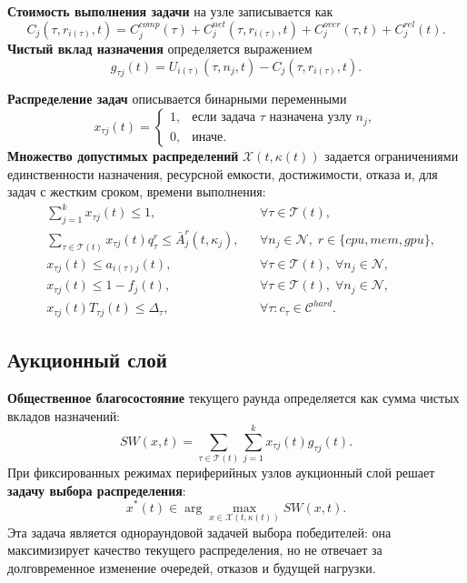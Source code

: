 \documentclass[a4paper,14pt]{extarticle}
\begin{document}
\textbf{Стоимость выполнения задачи} на узле записывается как
\begin{equation}
	C_j(\tau,r_{i(\tau)},t)=C^{comp}_j(\tau)+C^{net}_j(\tau,r_{i(\tau)},t)+C^{over}_j(\tau,t)+C^{rel}_j(t).
	\label{eq:nir_cost}
\end{equation}
\textbf{Чистый вклад назначения} определяется выражением
\begin{equation}
	g_{\tau j}(t)=U_{i(\tau)}(\tau,n_j,t)-C_j(\tau,r_{i(\tau)},t).
	\label{eq:nir_assignment_gain}
\end{equation}

\textbf{Распределение задач} описывается бинарными переменными
\begin{equation}
	x_{\tau j}(t)=
	\begin{cases}
		1, & \text{если задача } \tau \text{ назначена узлу } n_j,\\
		0, & \text{иначе.}
	\end{cases}
	\label{eq:nir_assignment_var}
\end{equation}
\textbf{Множество допустимых распределений} $\mathcal{X}(t,\kappa(t))$ задается ограничениями единственности назначения, ресурсной емкости, достижимости, отказа и, для задач с жестким сроком, времени выполнения:
\begin{align}
	&\sum_{j=1}^{k}x_{\tau j}(t)\leq 1, &&\forall \tau\in\mathcal{T}(t),
	\label{eq:nir_single_assignment}\\
	&\sum_{\tau\in\mathcal{T}(t)}x_{\tau j}(t)q^r_{\tau}\leq \bar{A}^{r}_{j}(t,\kappa_j), &&\forall n_j\in\mathcal{N},\; r\in\{cpu,mem,gpu\},
	\label{eq:nir_capacity_constraint}\\
	&x_{\tau j}(t)\leq a_{i(\tau)j}(t), &&\forall \tau\in\mathcal{T}(t),\; \forall n_j\in\mathcal{N},
	\label{eq:nir_reachability_constraint}\\
	&x_{\tau j}(t)\leq 1-f_j(t), &&\forall \tau\in\mathcal{T}(t),\; \forall n_j\in\mathcal{N},
	\label{eq:nir_failure_constraint}\\
	&x_{\tau j}(t)T_{\tau j}(t)\leq \Delta_{\tau}, &&\forall \tau: c_{\tau}\in\mathcal{C}^{hard}.
	\label{eq:nir_deadline_constraint}
\end{align}

\subsection{Аукционный слой}

\textbf{Общественное благосостояние} текущего раунда определяется как сумма чистых вкладов назначений:
\begin{equation}
	SW(x,t)=\sum_{\tau\in\mathcal{T}(t)}\sum_{j=1}^{k}x_{\tau j}(t)g_{\tau j}(t).
	\label{eq:nir_social_welfare}
\end{equation}
При фиксированных режимах периферийных узлов аукционный слой решает \textbf{задачу выбора распределения}:
\begin{equation}
	x^*(t)\in\arg\max_{x\in\mathcal{X}(t,\kappa(t))}SW(x,t).
	\label{eq:nir_wdp}
\end{equation}
Эта задача является однораундовой задачей выбора победителей: она максимизирует качество текущего распределения, но не отвечает за долговременное изменение очередей, отказов и будущей нагрузки.
\end{document}
